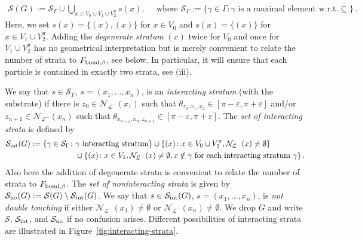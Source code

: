 \documentclass[reqno]{amsart}
\theoremstyle{plain}
\theoremstyle{definition}
\numberwithin{equation}{section}
\newcommand{\defas}{:=}
\begin{document}
\begin{align*}
\mathcal{S}(G):=  \mathcal{S}_\Gamma \cup \bigcup_{x \in V_0 \cup V_1 \cup V_2^\pi} s(x), \quad \text{ where } \mathcal{S}_\Gamma:=\{\gamma \in \Gamma \colon \gamma \text{ is a maximal element  w.r.t.}  \subseteq \}\,.
\end{align*}
Here, we set $s(x) =\{(x),(x)\}$ for $x \in V_0$ and  $s(x) = \{(x)\}$ for  $x \in V_1 \cup V_2^\pi$.  Adding the \emph{degenerate stratum} $(x)$   twice for $V_0$ and once for $V_1 \cup V_2^\pi$ has no geometrical interpretation but is merely convenient to relate  the number of  strata to $F_{{\rm bond},\beta}$, see  below. In particular,  it will ensure that  each  particle  is contained in exactly two strata, see (iii). 
 
 
  We say that $s\in \mathcal{S}_\Gamma$,  $s= (x_1,\ldots,x_n)$,  is an \emph{interacting stratum} (with the substrate) if there is $z_0 \in \mathcal{N}_{\mathcal{L}^-}(x_1)$ such that $\theta_{z_0,x_1,x_2} \in [\pi-\varepsilon,\pi+\varepsilon]$ and/or $z_{n+1} \in \mathcal{N}_{\mathcal{L}^-}(x_n)$ such that  $\theta_{x_{n-1},x_n,z_{n+1}} \in [\pi-\varepsilon,\pi+\varepsilon]$. The \emph{set of interacting strata}   is defined by 
 \begin{align*}
  \mathcal{S}_{\rm int} (G)   \defas \{ \gamma \in \mathcal{S}_\Gamma \colon & \gamma \text{ interacting stratum}\} \cup \{(x) \colon x\in   V_0    \cup V_2^\pi, \mathcal{N}_{\mathcal{L}^-}(x) \neq \emptyset\}\\&\cup \{(x) \colon x \in V_1, \mathcal{N}_{\mathcal{L}^-}(x) \neq \emptyset,  x\notin \gamma \text{ for each interacting stratum } 
 \gamma  \} \,.
 \end{align*}
  Also here the addition of degenerate strata is  convenient to relate  the number of  strata to $F_{{\rm bond},\beta}$.  
The \emph{set of noninteracting strata} is given by $ \mathcal{S}_{\rm no}  (G)  :=\mathcal{S} (G)   \setminus \mathcal{S}_{\rm int} (G) $. We say that $s \in \mathcal{S}_{\rm int} (G)$, $s= (x_1,\ldots,x_n)$, is \emph{not double touching} if either  $\mathcal{N}_{\mathcal{L}^-}(x_1) \neq \emptyset$ or  $\mathcal{N}_{\mathcal{L}^-}(x_n)\neq \emptyset$. We drop $G$ and write $\mathcal{S}$, $\mathcal{S}_{\rm int}$,  and  $\mathcal{S}_{\rm no}$ if no confusion arises. Different possibilities of interacting strata are illustrated in Figure~\ref{fig:interacting-strata}.
\end{document}
